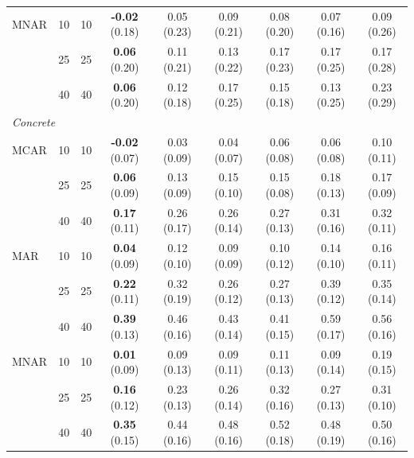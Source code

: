 \begin{tabular}{llrcccccc}
MNAR & 10 & 10 & \textbf{-0.02} (0.18) & 0.05 (0.23) & 0.09 (0.21) & 0.08 (0.20) & 0.07 (0.16) & 0.09 (0.26)\\
 & 25 & 25 & \textbf{0.06} (0.20) & 0.11 (0.21) & 0.13 (0.22) & 0.17 (0.23) & 0.17 (0.25) & 0.17 (0.28)\\
 & 40 & 40 & \textbf{0.06} (0.20) & 0.12 (0.18) & 0.17 (0.25) & 0.15 (0.18) & 0.13 (0.25) & 0.23 (0.29)\\
\midrule
\multicolumn{9}{l}{\textit{Concrete}}\\
MCAR & 10 & 10 & \textbf{-0.02} (0.07) & 0.03 (0.09) & 0.04 (0.07) & 0.06 (0.08) & 0.06 (0.08) & 0.10 (0.11)\\
 & 25 & 25 & \textbf{0.06} (0.09) & 0.13 (0.09) & 0.15 (0.10) & 0.15 (0.08) & 0.18 (0.13) & 0.17 (0.09)\\
 & 40 & 40 & \textbf{0.17} (0.11) & 0.26 (0.17) & 0.26 (0.14) & 0.27 (0.13) & 0.31 (0.16) & 0.32 (0.11)\\
MAR & 10 & 10 & \textbf{0.04} (0.09) & 0.12 (0.10) & 0.09 (0.09) & 0.10 (0.12) & 0.14 (0.10) & 0.16 (0.11)\\
 & 25 & 25 & \textbf{0.22} (0.11) & 0.32 (0.19) & 0.26 (0.12) & 0.27 (0.13) & 0.39 (0.12) & 0.35 (0.14)\\
 & 40 & 40 & \textbf{0.39} (0.13) & 0.46 (0.16) & 0.43 (0.14) & 0.41 (0.15) & 0.59 (0.17) & 0.56 (0.16)\\
MNAR & 10 & 10 & \textbf{0.01} (0.09) & 0.09 (0.13) & 0.09 (0.11) & 0.11 (0.13) & 0.09 (0.14) & 0.19 (0.15)\\
 & 25 & 25 & \textbf{0.16} (0.12) & 0.23 (0.13) & 0.26 (0.14) & 0.32 (0.16) & 0.27 (0.13) & 0.31 (0.10)\\
 & 40 & 40 & \textbf{0.35} (0.15) & 0.44 (0.16) & 0.48 (0.16) & 0.52 (0.18) & 0.48 (0.19) & 0.50 (0.16)\\
\bottomrule
\end{tabular}
